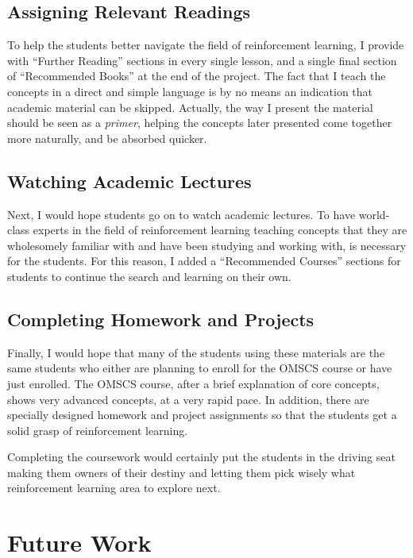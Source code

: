 \documentclass[11pt]{article} %
\begin{document}
\subsection{Assigning Relevant Readings}

To help the students better navigate the field of reinforcement learning,
I provide with ``Further Reading'' sections in every single lesson, and a
single final section of ``Recommended Books'' at the end of the project. The fact
that I teach the concepts in a direct and simple language is by no means
an indication that academic material can be skipped. Actually, the way I 
present the material should be seen as a \emph{primer}, helping the
concepts later presented come together more naturally, and be absorbed quicker.

\subsection{Watching Academic Lectures}

Next, I would hope students go on to watch academic lectures.
To have world-class experts in the field of reinforcement learning teaching
concepts that they are wholesomely familiar with and have been studying and working with, 
 is necessary for the students. For this reason, I added a ``Recommended Courses''
sections for students to continue the search and learning on their own.

\subsection{Completing Homework and Projects}

Finally, I would hope that many of the students using these materials are
the same students who either are planning to enroll for the OMSCS course or have just
enrolled. The OMSCS course, after a brief explanation of core concepts,
shows very advanced concepts, at a very rapid pace. In addition, there are specially
designed homework and project assignments so that the students get a solid
grasp of reinforcement learning.

Completing the coursework would certainly put the students in the driving seat
making them owners of their destiny and letting them pick wisely what reinforcement
learning area to explore next. 

\section{Future Work}
\end{document}
